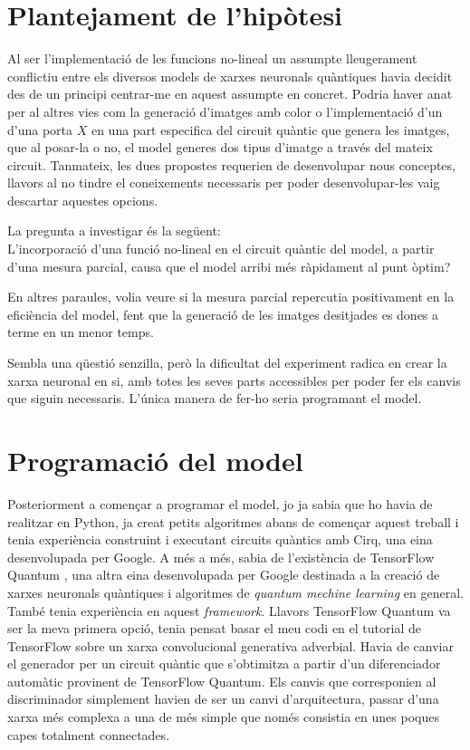 \chapter{Plantejament de l'hipòtesi}

Al ser l'implementació de les funcions no-lineal un assumpte lleugerament conflictiu entre els diversos models de xarxes neuronals quàntiques havia decidit des de un principi centrar-me en aquest assumpte en concret. Podria haver anat per al altres vies com la generació d'imatges amb color o l'implementació d'un d'una porta $X$ en una part especifica del circuit quàntic que genera les imatges, que al posar-la o no, el model generes dos tipus d'imatge a través del mateix circuit. Tanmateix, les dues propostes requerien de desenvolupar nous conceptes, llavors al no tindre el coneixements necessaris per poder desenvolupar-les vaig descartar aquestes opcions. 

La pregunta a investigar és la següent: \\
L'incorporació d'una funció no-lineal en el circuit quàntic del model, a partir d'una mesura parcial, causa que el model arribi més ràpidament al punt òptim?

En altres paraules, volia veure si la mesura parcial repercutia positivament en la eficiència del model, fent que la generació de les imatges desitjades es dones a terme en un menor temps. 

Sembla una qüestió senzilla, però la dificultat del experiment radica en crear la xarxa neuronal en si, amb totes les seves parts accessibles per poder fer els canvis que siguin necessaris. L'única manera de fer-ho seria programant el model. 

\chapter{Programació del model}

Posteriorment a començar a programar el model, jo ja sabia que ho havia de realitzar en Python, ja creat petits algoritmes abans de començar aquest treball i tenia experiència construint i executant circuits quàntics amb Cirq, una eina desenvolupada per Google. A més a més, sabia de l'existència de TensorFlow Quantum \cite{tfq}, una altra eina desenvolupada per Google destinada a la creació de xarxes neuronals quàntiques i algoritmes de \textit{quantum mechine learning} en general. També tenia experiència en aquest \textit{framework}. Llavors TensorFlow Quantum va ser la meva primera opció, tenia pensat basar el meu codi en el tutorial de TensorFlow sobre un xarxa convolucional generativa adverbial. Havia de canviar el generador per un circuit quàntic que s'obtimitza a partir d'un diferenciador automàtic provinent de TensorFlow Quantum. Els canvis que corresponien al discriminador simplement havien de ser un canvi d'arquitectura, passar d'una xarxa més complexa a una de més simple que només consistia en unes poques capes totalment connectades. 

